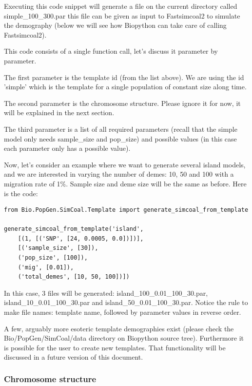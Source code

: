 \documentclass{report}
\begin{document}
Executing this code snippet will generate a file on the current directory called
simple\_100\_300.par this file can be given as input to Fastsimcoal2 to simulate the
demography (below we will see how Biopython can take care of calling
Fastsimcoal2).

This code consists of a single function call, let's discuss it parameter by parameter.

The first parameter is the template id (from the list above). We are using the id
'simple' which is the template for a single population of constant size along time.

The second parameter is the chromosome structure. Please ignore it for now, it will be
explained in the next section.

The third parameter is a list of all required parameters (recall that the simple model
only needs sample\_size and pop\_size) and possible values (in this case each
parameter only has a possible value).

Now, let's consider an example where we want to generate several island models, and we
are interested in varying the number of demes: 10, 50 and 100 with a migration
rate of 1\%. Sample size and deme
size will be the same as before. Here is the code:


\begin{verbatim}
from Bio.PopGen.SimCoal.Template import generate_simcoal_from_template

generate_simcoal_from_template('island',
    [(1, [('SNP', [24, 0.0005, 0.0])])],
    [('sample_size', [30]),
    ('pop_size', [100]),
    ('mig', [0.01]),
    ('total_demes', [10, 50, 100])])
\end{verbatim}

In this case, 3 files will be generated: island\_100\_0.01\_100\_30.par,
island\_10\_0.01\_100\_30.par and island\_50\_0.01\_100\_30.par. Notice the
rule to make file names: template name, followed by parameter values in
reverse order.

A few, arguably more esoteric template demographies exist (please check the
Bio/PopGen/SimCoal/data directory on Biopython source tree). Furthermore it is possible
for the user to create new templates. That functionality will be discussed in a future
version of this document.

\subsubsection{Chromosome structure}
\end{document}
